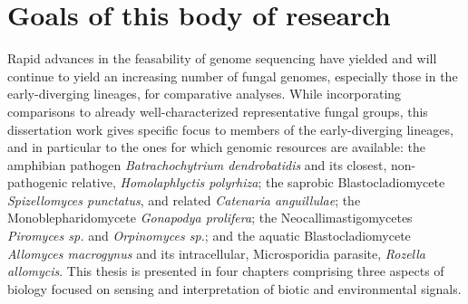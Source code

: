 \section{Goals of this body of research}
\indent Rapid advances in the feasability of genome sequencing have yielded and will continue to yield an increasing number of fungal genomes, especially those in the early-diverging lineages, for comparative analyses. While incorporating comparisons to already well-characterized representative fungal groups, this dissertation work gives specific focus to members of the early-diverging lineages, and in particular to the ones for which genomic resources are available: the amphibian pathogen \textit{Batrachochytrium dendrobatidis} and its closest, non-pathogenic relative, \textit{Homolaphlyctis polyrhiza}; the saprobic Blastocladiomycete \textit{Spizellomyces punctatus}, and related \textit{Catenaria anguillulae}; the Monoblepharidomycete \textit{Gonapodya prolifera}; the Neocallimastigomycetes \textit{Piromyces sp.} and \textit{Orpinomyces sp.}; and the aquatic Blastocladiomycete \textit{Allomyces macrogynus} and its intracellular, Microsporidia parasite, \textit{Rozella allomycis}. This thesis is presented in four chapters comprising three aspects of biology focused on sensing and interpretation of biotic and environmental signals.\\
